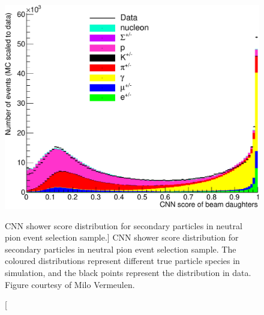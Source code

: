 \begin{figure}
	\centering
	\includegraphics[width=\textwidth]{figures/cnn_pi_0.pdf}  
	\caption
	[CNN shower score distribution for secondary particles in neutral pion event
	selection sample.]
	{CNN shower score distribution for secondary particles in neutral pion event
	selection sample. The coloured distributions represent different true particle
	species in \protodune{} simulation, and the black points represent the
	distribution in \protodune{} data. Figure courtesy of Milo
	Vermeulen\cite{pi_0}.}
	\label{fig:milo_pi0}
\end{figure}
